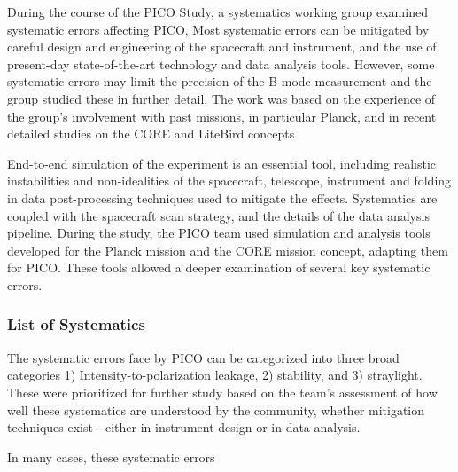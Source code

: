 \documentclass[PICOReport.tex]{subfiles}
\begin{document}
During the course of the PICO Study, a systematics working group
examined systematic errors affecting PICO,
Most  systematic errors can be mitigated by careful design and engineering of 
the spacecraft and instrument, and the use of present-day state-of-the-art
technology and data analysis tools.   
However, some systematic errors may
limit the precision of the B-mode measurement and the group studied
these in further detail. 
The work was based on the experience of the group's involvement with
past missions, in particular Planck, and in recent detailed studies on
the CORE and LiteBird  concepts

End-to-end simulation of the experiment is an essential tool,
including realistic instabilities and non-idealities of the spacecraft,
telescope, instrument and folding in data post-processing techniques
used to mitigate the effects.  Systematics are coupled with the
spacecraft scan strategy, and the details of the 
data analysis pipeline.  During the study, the PICO team used 
 simulation and analysis tools developed for the Planck mission\cite{plank2015_xii_focalplane} and 
the CORE mission concept, adapting them for PICO.  These tools allowed
a deeper examination of several key systematic errors. 

\subsubsection{List of Systematics}
The systematic errors face by PICO can be categorized into three broad categories 
1) Intensity-to-polarization leakage, 2) stability, and 3)
straylight.    These were prioritized for further study based on the
team's assessment of how well these systematics are understood by the
community, whether mitigation techniques exist - either in instrument
design or in data analysis.

In many cases, these systematic errors
\end{document}
